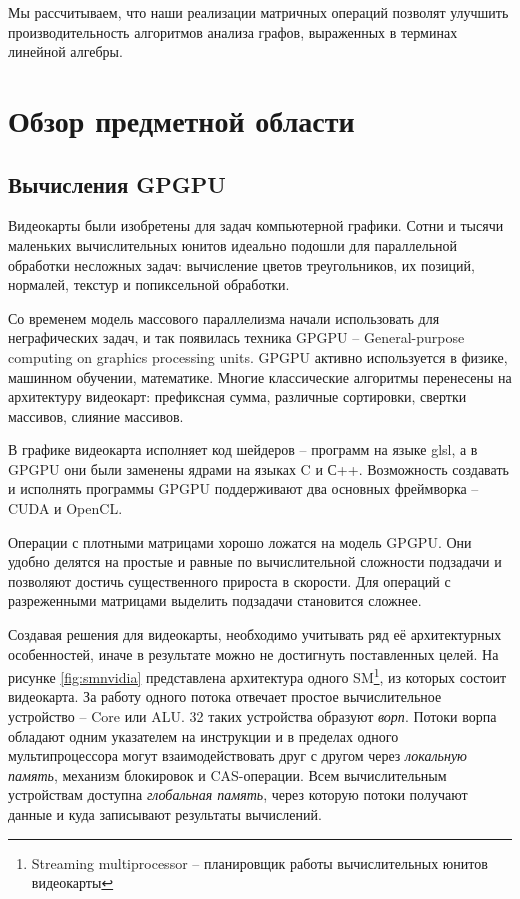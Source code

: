 \documentclass[14pt]{extarticle}
\newcommand{\sectionbreak}{\clearpage}
\begin{document}
	 
	 Мы рассчитываем, что наши реализации матричных операций позволят улучшить производительность алгоритмов анализа графов, выраженных в терминах линейной алгебры. 
	 
	 \sectionbreak
	 
\section{Обзор предметной области}	

	\subsection{Вычисления GPGPU}
	
	Видеокарты были изобретены для задач компьютерной графики. Сотни и тысячи маленьких вычислительных юнитов идеально подошли для параллельной обработки несложных задач: вычисление цветов треугольников, их позиций, нормалей, текстур и попиксельной обработки. 
	
	Со временем модель массового параллелизма начали использовать для неграфических задач, и так появилась техника GPGPU -- General-purpose computing on graphics processing units. GPGPU активно используется в физике, машинном обучении, математике. Многие классические алгоритмы перенесены на архитектуру видеокарт: префиксная сумма, различные сортировки, свертки массивов, слияние массивов.
	
	В графике видеокарта исполняет код шейдеров -- программ на языке glsl, а в GPGPU они были заменены ядрами на языках C и С++. Возможность создавать и исполнять программы GPGPU поддерживают два основных фреймворка -- CUDA и OpenCL. 
	
	Операции с плотными матрицами хорошо ложатся на модель GPGPU. Они удобно делятся на простые и равные по вычислительной сложности подзадачи и позволяют достичь существенного прироста в скорости. Для операций с разреженными матрицами выделить подзадачи становится сложнее.
	
	
	
	Создавая решения для видеокарты, необходимо учитывать ряд её архитектурных особенностей, иначе в результате можно не достигнуть поставленных целей. На рисунке \ref{fig:smnvidia} представлена архитектура одного SM\footnote{Streaming multiprocessor -- планировщик работы вычислительных юнитов видеокарты}, из которых состоит видеокарта. За работу одного потока отвечает простое вычислительное устройство -- Core или ALU. 32 таких устройства образуют \emph{ворп}. Потоки ворпа обладают одним указателем на инструкции и в пределах одного мультипроцессора могут взаимодействовать друг с другом через \emph{локальную память}, механизм блокировок и CAS-операции. Всем вычислительным устройствам доступна \emph{глобальная память}, через которую потоки получают данные и куда записывают результаты вычислений. 
	
\end{document}
